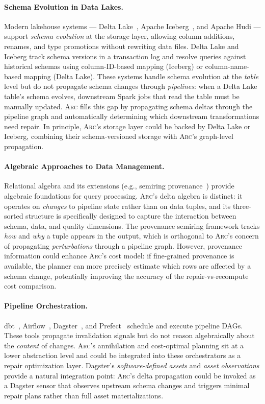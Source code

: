 \documentclass[sigplan,screen,nonacm]{acmart}
\newcommand{\arc}{\textsc{Arc}\xspace}
\begin{document}
\paragraph{Schema Evolution in Data Lakes.}
Modern lakehouse systems --- Delta Lake~\cite{armbrust2020delta},
Apache Iceberg~\cite{iceberg2023}, and Apache Hudi --- support
\emph{schema evolution} at the storage layer, allowing column
additions, renames, and type promotions without rewriting data files.
Delta Lake and Iceberg track schema versions in a transaction log
and resolve queries against historical schemas using column-ID-based
mapping (Iceberg) or column-name-based mapping (Delta Lake).
These systems handle schema evolution at the \emph{table} level but
do not propagate schema changes through \emph{pipelines}: when a
Delta Lake table's schema evolves, downstream Spark jobs that read
the table must be manually updated.  \arc fills this gap by
propagating schema deltas through the pipeline graph and
automatically determining which downstream transformations need
repair.  In principle, \arc's storage layer could be backed by
Delta Lake or Iceberg, combining their schema-versioned storage
with \arc's graph-level propagation.

\paragraph{Algebraic Approaches to Data Management.}
Relational algebra and its extensions (e.g., semiring
provenance~\cite{green2007provenance}) provide algebraic foundations for
query processing.  \arc's delta algebra is distinct: it operates on
\emph{changes} to pipeline state rather than on data tuples, and its
three-sorted structure is specifically designed to capture the interaction
between schema, data, and quality dimensions.  The provenance semiring
framework tracks \emph{how} and \emph{why} a tuple appears in the
output, which is orthogonal to \arc's concern of propagating
\emph{perturbations} through a pipeline graph.  However, provenance
information could enhance \arc's cost model: if fine-grained provenance
is available, the planner can more precisely estimate which rows are
affected by a schema change, potentially improving the accuracy of the
repair-vs-recompute cost comparison.

\paragraph{Pipeline Orchestration.}
dbt~\cite{dbt2023}, Airflow~\cite{airflow2023}, Dagster~\cite{dagster2023},
and Prefect~\cite{prefect2023} schedule and execute pipeline DAGs.  These
tools propagate invalidation signals but do not reason algebraically about
the \emph{content} of changes.  \arc's annihilation and cost-optimal
planning sit at a lower abstraction level and could be integrated into
these orchestrators as a repair optimization layer.  Dagster's
\emph{software-defined assets} and \emph{asset observations} provide a
natural integration point: \arc's delta propagation could be invoked as
a Dagster sensor that observes upstream schema changes and triggers
minimal repair plans rather than full asset materializations.
\end{document}
